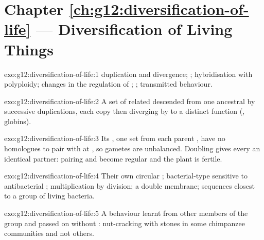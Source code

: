 \section*{Chapter \ref{ch:g12:diversification-of-life} --- Diversification of Living Things}

\begin{solution}{exo:g12:diversification-of-life:1}
 duplication and divergence; ;
hybridisation with polyploidy; changes in the regulation of
; ; transmitted behaviour.
\end{solution}

\begin{solution}{exo:g12:diversification-of-life:2}
A set of related  descended from one ancestral  by
successive duplications, each copy then diverging by  to a
distinct function (, globins).
\end{solution}

\begin{solution}{exo:g12:diversification-of-life:3}
Its , one set from each parent , have no homologues
to pair with at , so gametes are unbalanced. Doubling gives
every  an identical partner: pairing and  become
regular and the plant is fertile.
\end{solution}

\begin{solution}{exo:g12:diversification-of-life:4}
Their own circular ; bacterial-type  sensitive to
antibacterial ; multiplication by division; a double
membrane; sequences closest to a group of living bacteria.
\end{solution}

\begin{solution}{exo:g12:diversification-of-life:5}
A behaviour learnt from other members of the group and passed on
without : nut-cracking with stones in some chimpanzee
communities and not others.
\end{solution}

